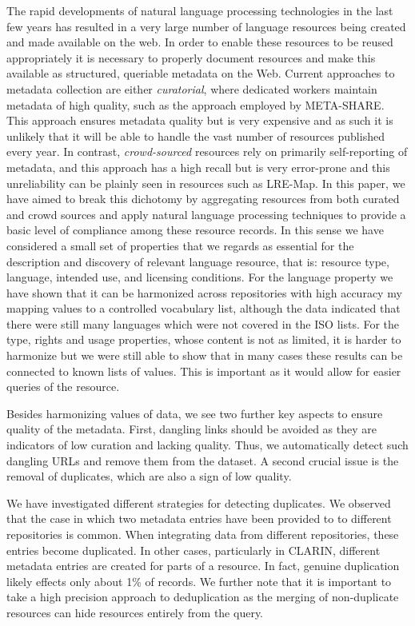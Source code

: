 \documentclass[11pt]{article}
\begin{document}
The rapid developments of natural language processing technologies in the last
few years has resulted in a very large number of language resources being
created and made available on the web. In order to enable these resources to be
reused appropriately it is necessary to properly document resources and make
this available as structured, queriable metadata on the Web. Current approaches
to metadata collection are either \emph{curatorial}, where dedicated workers
maintain metadata of high quality, such as the approach employed by META-SHARE.
This approach ensures metadata quality but is very expensive and as such it is
unlikely that it will be able to handle the vast number of resources published
every year. In contrast, \emph{crowd-sourced} resources rely on primarily
self-reporting of metadata, and this approach has a high recall but is very
error-prone and this unreliability can be plainly seen in resources such as
LRE-Map. In this paper, we have aimed to break this dichotomy by aggregating
resources from both curated and crowd sources and apply natural language
processing techniques to provide a basic level of compliance among these
resource records. In this sense we have considered a small set of properties that we regards as essential for the description and discovery of relevant language resource, that is: resource type, language, intended use, and licensing conditions.
For the
language property we have shown that it can be harmonized across repositories with high accuracy my mapping values to a 
controlled vocabulary list, although the data indicated that there were still
many languages which were not covered in the ISO lists. For the type, rights and usage
properties, whose content is not as limited, it is harder to harmonize but we
were still able to show that in many cases these results can be connected to
known lists of values. This is important as it would allow for easier queries of
the resource. 

Besides harmonizing values of data, we see two further key aspects to ensure quality of the metadata.
First, dangling links should be avoided as they are indicators of low curation and lacking quality. Thus, we automatically detect such dangling URLs and remove them from the dataset. A second crucial issue is the removal of duplicates, which are also a sign of low quality.

We have investigated different strategies for detecting duplicates. We observed that the case in which two metadata entries have been provided to to different repositories is common. When integrating data from different repositories, these entries become duplicated. In other cases, particularly in CLARIN, different metadata entries are created for parts of a resource. In fact, genuine duplication likely
effects only about 1\% of records. We further note that it is important to take
a high precision approach to deduplication as the merging of non-duplicate
resources can hide resources entirely from the query.
\end{document}
